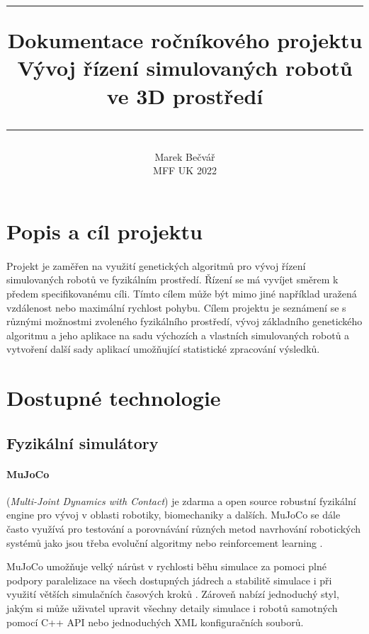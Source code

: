 \documentclass[a4paper, 12pt]{article}
\title{
        \vspace{1in}
        \rule{\linewidth}{0.5pt}
		\usefont{OT1}{bch}{b}{n}
        \huge Dokumentace ročníkového projektu \\\vspace{20pt}Vývoj řízení
        simulovaných robotů ve 3D prostředí
        \vspace{-10pt}
        \rule{\linewidth}{1pt}
}
\author{
		\normalfont\normalsize
        Marek Bečvář\\\normalsize
        MFF UK 2022
}
\date{}
\begin{document}
\maketitle 
\newpage

\tableofcontents
\newpage

\section{Popis a cíl projektu} 
\paragraph{}
Projekt je zaměřen na využití genetických algoritmů pro vývoj řízení simulovaných 
robotů ve fyzikálním prostředí. Řízení se má vyvíjet směrem k předem
specifikovanému cíli. Tímto cílem může být mimo jiné například uražená vzdálenost nebo
maximální rychlost pohybu.
Cílem projektu je seznámení se s různými možnostmi zvoleného fyzikálního
prostředí, vývoj základního genetického algoritmu a jeho aplikace na sadu
výchozích a vlastních simulovaných robotů a vytvoření další sady aplikací
umožňující statistické zpracování výsledků. 

\section{Dostupné technologie}
\subsection{Fyzikální simulátory}
\paragraph {MuJoCo} (\emph{Multi-Joint Dynamics with Contact}) je zdarma a open 
source robustní fyzikální engine pro vývoj v oblasti robotiky, biomechaniky a dalších.
MuJoCo se dále často využívá pro testování a porovnávání různých metod
navrhování robotických systémů jako jsou třeba evoluční algoritmy nebo reinforcement
learning \cite{salimans2017evolution}.

MuJoCo umožňuje velký nárůst v rychlosti běhu simulace za pomoci plné podpory
paralelizace na všech dostupných jádrech a stabilitě simulace i při využití
větších simulačních časových kroků \cite{todorov2012mujoco}. Zároveň nabízí jednoduchý styl,
jakým si může uživatel upravit všechny detaily simulace i robotů samotných
pomocí C++ API nebo jednoduchých XML konfiguračních souborů. 
\end{document}
